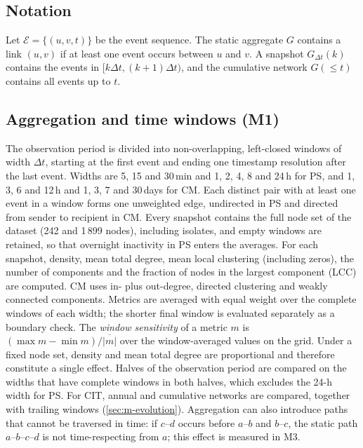 \subsection{Notation}
\label{sec:notation}
Let $\mathcal{E}=\{(u,v,t)\}$ be the event sequence. The static aggregate $G$
contains a link $(u,v)$ if at least one event occurs between $u$ and $v$. A
snapshot $G_{\Delta t}(k)$ contains the events in $[k\Delta t,(k+1)\Delta t)$, and the
cumulative network $G(\le t)$ contains all events up to $t$.

\subsection{Aggregation and time windows (M1)}
\label{sec:m-aggregation}
The observation period is divided into non-overlapping, left-closed windows of width
$\Delta t$, starting at the first event and ending one timestamp resolution after the last
event. Widths are 5, 15 and 30\,min and 1, 2, 4, 8 and 24\,h for PS, and 1, 3, 6 and
12\,h and 1, 3, 7 and 30\,days for CM. Each distinct pair with at least one event in a
window forms one unweighted edge, undirected in PS and directed from sender to recipient
in CM. Every snapshot contains the full node set of the dataset (242 and 1\,899 nodes),
including isolates, and empty windows are retained, so that overnight inactivity in PS
enters the averages. For each snapshot, density, mean total degree, mean local clustering
(including zeros), the number of components and the fraction of nodes in the largest
component (LCC) are computed. CM uses in- plus out-degree, directed clustering
\citep{fagiolo2007clustering} and weakly connected components. Metrics are averaged with
equal weight over the complete windows of each width; the shorter final window is
evaluated separately as a boundary check. The \emph{window sensitivity} of a metric $m$ is
$(\max m-\min m)/\overline{|m|}$ over the window-averaged values on the grid. Under a fixed
node set, density and mean total degree are proportional and therefore constitute a single
effect. Halves of the observation period are compared on the widths that have complete
windows in both halves, which excludes the 24-h width for PS. For CIT, annual and
cumulative networks are compared, together with trailing windows (\cref{sec:m-evolution}).
Aggregation can also introduce paths that cannot be traversed in time: if $c$--$d$ occurs
before $a$--$b$ and $b$--$c$, the static path $a$--$b$--$c$--$d$ is not time-respecting
from $a$; this effect is measured in M3.

